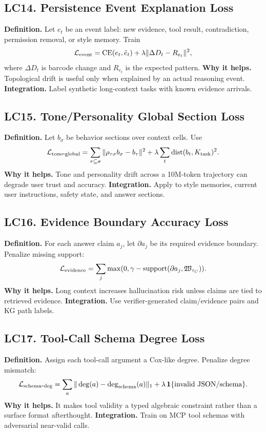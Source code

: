 \documentclass[11pt]{article}
\newcommand{\dist}{\operatorname{dist}}
\newcommand{\CE}{\operatorname{CE}}
\newcommand{\loss}{\mathcal{L}}
\numberwithin{equation}{section}
\begin{document}
\subsection{LC14. Persistence Event Explanation Loss}
\textbf{Definition.} Let $e_t$ be an event label: new evidence, tool result, contradiction, permission removal, or style memory. Train
\begin{equation}
\loss_{\rm event}=\CE(e_t,\hat e_t)+\lambda\|\Delta D_t-R_{e_t}\|^2,
\end{equation}
where $\Delta D_t$ is barcode change and $R_{e_t}$ is the expected pattern. \textbf{Why it helps.} Topological drift is useful only when explained by an actual reasoning event. \textbf{Integration.} Label synthetic long-context tasks with known evidence arrivals.

\subsection{LC15. Tone/Personality Global Section Loss}
\textbf{Definition.} Let $b_\sigma$ be behavior sections over context cells. Use
\begin{equation}
\loss_{\rm tone\mbox{-}global}=\sum_{\tau\subseteq\sigma}\|\rho_{\tau\sigma}b_\sigma-b_\tau\|^2+\lambda\sum_t\dist(b_t,K_{\rm task})^2.
\end{equation}
\textbf{Why it helps.} Tone and personality drift across a 10M-token trajectory can degrade user trust and accuracy. \textbf{Integration.} Apply to style memories, current user instructions, safety state, and answer sections.

\subsection{LC16. Evidence Boundary Accuracy Loss}
\textbf{Definition.} For each answer claim $a_j$, let $\partial a_j$ be its required evidence boundary. Penalize missing support:
\begin{equation}
\loss_{\rm evidence}=\sum_j\max(0,\gamma-\operatorname{support}(\partial a_j,\mathfrak{W}_{\tau_C})).
\end{equation}
\textbf{Why it helps.} Long context increases hallucination risk unless claims are tied to retrieved evidence. \textbf{Integration.} Use verifier-generated claim/evidence pairs and KG path labels.

\subsection{LC17. Tool-Call Schema Degree Loss}
\textbf{Definition.} Assign each tool-call argument a Cox-like degree. Penalize degree mismatch:
\begin{equation}
\loss_{\rm schema\mbox{-}deg}=\sum_a \|\deg(a)-\deg_{\rm schema}(a)\|_1+\lambda\,\mathbf{1}\{\text{invalid JSON/schema}\}.
\end{equation}
\textbf{Why it helps.} It makes tool validity a typed algebraic constraint rather than a surface format afterthought. \textbf{Integration.} Train on MCP tool schemas with adversarial near-valid calls.
\end{document}
